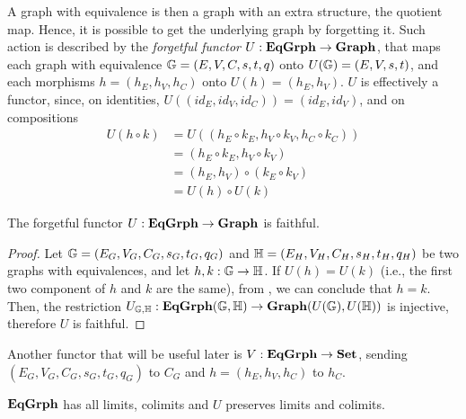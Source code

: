 A graph with equivalence is then a graph with an extra structure, the quotient map. Hence, it is possible to get the underlying graph by forgetting it. Such action is described by the \emph{forgetful functor} $U : \mathbf{EqGrph} \to \mathbf{Graph}$, that maps each graph with equivalence $\mathbb{G} =  (E, V, C, s, t, q)$ onto $U(\mathbb{G}) = (E, V, s, t)$, and each morphisms $h = (h_E, h_V, h_C)$ onto $U(h) = (h_E, h_V)$. $U$ is effectively a functor, since, on identities, $U((id_E, id_V, id_C)) = (id_E, id_V)$, and on compositions 
\[\begin{split}
	U(h \circ k) &= U((h_E \circ k_E, h_V \circ k_V, h_C \circ k_C))\\ &= (h_E \circ k_E, h_V \circ k_V) \\&= (h_E, h_V) \circ (k_E \circ k_V) \\&= U(h) \circ U(k)
\end{split}\]

\begin{prop}\label{prop:U_is_faithf}
    The forgetful functor $U: \mathbf{EqGrph} \to \mathbf{Graph}$ is faithful.
\end{prop}

\begin{proof}
    Let $\mathbb{G} = (E_G, V_G, C_G, s_G, t_G, q_G)$ and $\mathbb{H} = (E_H, V_H, C_H, s_H, t_H, q_H)$  be two graphs with equivalences, and let $h, k : \mathbb{G \to H}$.
    If $U(h) = U(k)$ (i.e., the first two component of $h$ and $k$ are the same), from , we can conclude that $h = k$. Then, the restriction $U_{\mathbb{G, H}} : \mathbf{EqGrph}(\mathbb{G, H}) \to \mathbf{Graph}(U(\mathbb{G}), U(\mathbb{H}))$ is injective, therefore $U$ is faithful.
\end{proof}

Another functor that will be useful later is $V: \mathbf{EqGrph} \to \mathbf{Set}$, sending $(E_G, V_G, C_G, s_G, t_G, q_G)$ to $C_G$ and $h = (h_E, h_V, h_C)$ to $h_C$.

\begin{prop}\label{prop:eqgrph_complete}
    $\mathbf{EqGrph}$ has all limits, colimits and $U$ preserves limits and colimits.
\end{prop}

